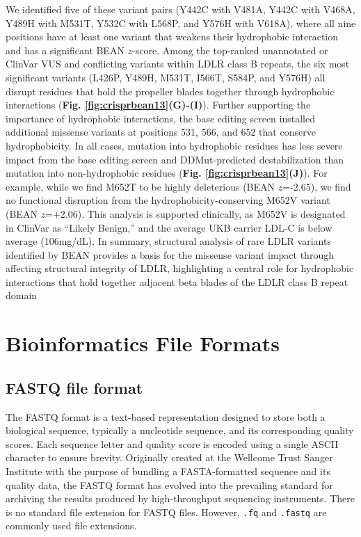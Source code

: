 \documentclass[a4paper, titlepage, openright]{book}
\begin{document}
We identified five of these variant pairs (Y442C with V481A, Y442C with V468A, Y489H with M531T, Y532C with L568P, and Y576H with V618A), where all nine positions have at least one variant that weakens their hydrophobic interaction and has a significant BEAN $z$-score. Among the top-ranked unannotated or ClinVar VUS and conflicting variants within LDLR class B repeats, the six most significant variants (L426P, Y489H, M531T, I566T, S584P, and Y576H) all disrupt residues that hold the propeller blades together through hydrophobic interactions (\textbf{Fig. \ref{fig:crisprbean13}(G)-(I)}). Further supporting the importance of hydrophobic interactions, the base editing screen installed additional missense variants at positions 531, 566, and 652 that conserve hydrophobicity. In all cases, mutation into hydrophobic residues has less severe impact from the base editing screen and DDMut-predicted destabilization than mutation into non-hydrophobic residues (\textbf{Fig. \ref{fig:crisprbean13}(J)}). For example, while we find M652T to be highly deleterious (BEAN $z$=-2.65), we find no functional disruption from the hydrophobicity-conserving M652V variant (BEAN $z$=+2.06). This analysis is supported clinically, as M652V is designated in ClinVar as “Likely Benign,” and the average UKB carrier LDL-C is below average (106mg/dL). In summary, structural analysis of rare LDLR variants identified by BEAN provides a basis for the missense variant impact through affecting structural integrity of LDLR, highlighting a central role for hydrophobic interactions that hold together adjacent beta blades of the LDLR class B repeat domain


\appendix
\chapter{Bioinformatics File Formats}\label{appendix:fileformats}

\section{FASTQ file format}
The FASTQ format is a text-based representation designed to store both a biological sequence, typically a nucleotide sequence, and its corresponding quality scores. Each sequence letter and quality score is encoded using a single ASCII character to ensure brevity. Originally created at the Wellcome Trust Sanger Institute with the purpose of bundling a FASTA-formatted sequence and its quality data, the FASTQ format has evolved into the prevailing standard for archiving the results produced by high-throughput sequencing instruments. There is no standard file extension for FASTQ files. However, \texttt{.fq} and \texttt{.fastq} are commonly used file extensions.
\end{document}
